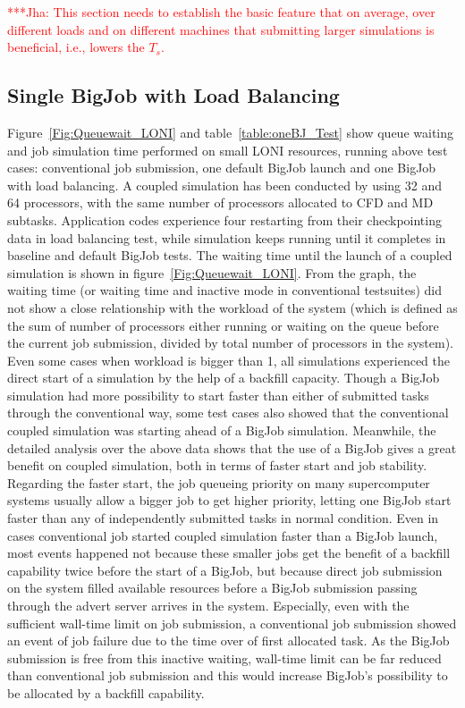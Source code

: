 \documentclass[conference,final]{IEEEtran}
\newcommand{\jhanote}[1]{ {\textcolor{red} { ***Jha: #1 }}}
\newcommand{\jhanote}[1]{}
\newcommand{\ts}{$T_{s}$}
\begin{document}
\jhanote{This section needs to establish the basic feature that on
  average, over different loads and on different machines that
  submitting larger simulations is beneficial, i.e., lowers the \ts.}


\subsection{Single BigJob with Load Balancing}



Figure~\ref{Fig:Queuewait_LONI} and table~\ref{table:oneBJ_Test} show
queue waiting and job simulation time performed on small LONI
resources, running above test cases: conventional job submission, one
default BigJob launch and one BigJob with load balancing. A coupled
simulation has been conducted by using 32 and 64 processors, with the
same number of processors allocated to CFD and MD
subtasks. Application codes experience four restarting from their
checkpointing data in load balancing test, while simulation keeps
running until it completes in baseline and default BigJob tests.  The
waiting time until the launch of a coupled simulation is shown in
figure~\ref{Fig:Queuewait_LONI}. From the graph, the waiting time (or
waiting time and inactive mode in conventional testsuites) did not
show a close relationship with the workload of the system (which is
defined as the sum of number of processors either running or waiting
on the queue before the current job submission, divided by total
number of processors in the system). Even some cases when workload is
bigger than 1, all simulations experienced the direct start of a
simulation by the help of a backfill capacity. Though a BigJob
simulation had more possibility to start faster than either of
submitted tasks through the conventional way, some test cases also
showed that the conventional coupled simulation was starting ahead of
a BigJob simulation.  Meanwhile, the detailed analysis over the above
data shows that the use of a BigJob gives a great benefit on coupled
simulation, both in terms of faster start and job stability. Regarding
the faster start, the job queueing priority on many supercomputer
systems usually allow a bigger job to get higher priority, letting one
BigJob start faster than any of independently submitted tasks in
normal condition. Even in cases conventional job started coupled
simulation faster than a BigJob launch, most events happened not
because these smaller jobs get the benefit of a backfill capability
twice before the start of a BigJob, but because direct job submission
on the system filled available resources before a BigJob submission
passing through the advert server arrives in the system. Especially,
even with the sufficient wall-time limit on job submission, a
conventional job submission showed an event of job failure due to the
time over of first allocated task. As the BigJob submission is free
from this inactive waiting, wall-time limit can be far reduced than
conventional job submission and this would increase BigJob's
possibility to be allocated by a backfill capability.
\end{document}

